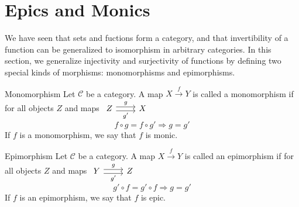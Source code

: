 \section {Epics and Monics}
We have seen that sets and fuctions form a category, and that invertibility of a function can be generalized to isomorphism in arbitrary categories. In this section, we generalize injectivity and surjectivity of functions by defining two special kinds of morphisms: monomorphisms and epimorphisms.

\begin{definition}{Monomorphism}
  Let $\mathscr{C}$ be a category. A map $X \overset{f}{\to} Y$ is called a monomorphism if for all objects $Z$ and maps
  $
  \begin{tikzcd}
    Z \arrow[r,shift left, "g"] \arrow[r,shift right,swap,"g'"] & X
  \end{tikzcd}
  $
  \[
    f \circ g = f \circ g' \Rightarrow g = g'
  \]
  If $f$ is a monomorphism, we say that $f$ is monic.
\end{definition}

\begin{definition}{Epimorphism}
  Let $\mathscr{C}$ be a category. A map $X \overset{f}{\to} Y$ is called an epimorphism if for all objects $Z$ and maps
  $
  \begin{tikzcd}
    Y \arrow[r,shift left, "g"] \arrow[r,shift right,swap,"g'"] & Z
  \end{tikzcd}
  $
  \[
    g' \circ f = g' \circ f \Rightarrow g = g'
  \]
  If $f$ is an epimorphism, we say that $f$ is epic.
\end{definition}


